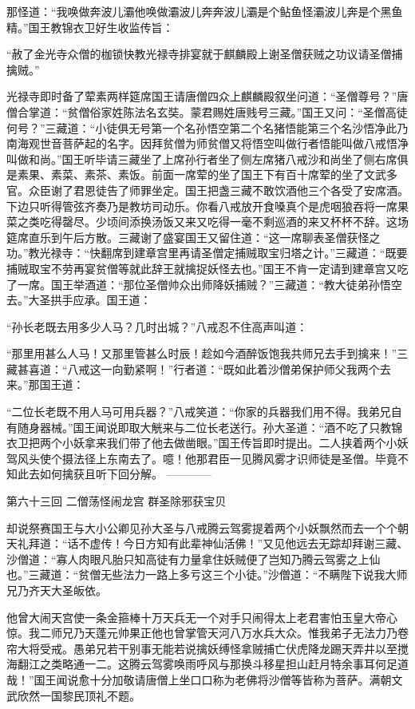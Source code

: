 \documentclass[12pt,UTF8]{ctexbook}
\begin{document}
那怪道：“我唤做奔波儿灞他唤做灞波儿奔奔波儿灞是个鲇鱼怪灞波儿奔是个黑鱼精。”国王教锦衣卫好生收监传旨：

“赦了金光寺众僧的枷锁快教光禄寺排宴就于麒麟殿上谢圣僧获贼之功议请圣僧捕擒贼。”

光禄寺即时备了荤素两样筵席国王请唐僧四众上麒麟殿叙坐问道：“圣僧尊号？”唐僧合掌道：“贫僧俗家姓陈法名玄奘。蒙君赐姓唐贱号三藏。”国王又问：“圣僧高徒何号？”三藏道：“小徒俱无号第一个名孙悟空第二个名猪悟能第三个名沙悟净此乃南海观世音菩萨起的名字。因拜贫僧为师贫僧又将悟空叫做行者悟能叫做八戒悟净叫做和尚。”国王听毕请三藏坐了上席孙行者坐了侧左席猪八戒沙和尚坐了侧右席俱是素果、素菜、素茶、素饭。前面一席荤的坐了国王下有百十席荤的坐了文武多官。众臣谢了君恩徒告了师罪坐定。国王把盏三藏不敢饮酒他三个各受了安席酒。下边只听得管弦齐奏乃是教坊司动乐。你看八戒放开食嗓真个是虎咽狼吞将一席果菜之类吃得罄尽。少顷间添换汤饭又来又吃得一毫不剩巡酒的来又杯杯不辞。这场筵席直乐到午后方散。三藏谢了盛宴国王又留住道：“这一席聊表圣僧获怪之功。”教光禄寺：“快翻席到建章宫里再请圣僧定捕贼取宝归塔之计。”三藏道：“既要捕贼取宝不劳再宴贫僧等就此辞王就擒捉妖怪去也。”国王不肯一定请到建章宫又吃了一席。国王举酒道：“那位圣僧帅众出师降妖捕贼？”三藏道：“教大徒弟孙悟空去。”大圣拱手应承。国王道：

“孙长老既去用多少人马？几时出城？”八戒忍不住高声叫道：

“那里用甚么人马！又那里管甚么时辰！趁如今酒醉饭饱我共师兄去手到擒来！”三藏甚喜道：“八戒这一向勤紧啊！”行者道：“既如此着沙僧弟保护师父我两个去来。”那国王道：

“二位长老既不用人马可用兵器？”八戒笑道：“你家的兵器我们用不得。我弟兄自有随身器械。”国王闻说即取大觥来与二位长老送行。孙大圣道：“酒不吃了只教锦衣卫把两个小妖拿来我们带了他去做凿眼。”国王传旨即时提出。二人挟着两个小妖驾风头使个摄法径上东南去了。噫！他那君臣一见腾风雾才识师徒是圣僧。毕竟不知此去如何擒获且听下回分解。
------------

第六十三回 二僧荡怪闹龙宫 群圣除邪获宝贝

却说祭赛国王与大小公卿见孙大圣与八戒腾云驾雾提着两个小妖飘然而去一个个朝天礼拜道：“话不虚传！今日方知有此辈神仙活佛！”又见他远去无踪却拜谢三藏、沙僧道：“寡人肉眼凡胎只知高徒有力量拿住妖贼便了岂知乃腾云驾雾之上仙也。”三藏道：“贫僧无些法力一路上多亏这三个小徒。”沙僧道：“不瞒陛下说我大师兄乃齐天大圣皈依。

他曾大闹天宫使一条金箍棒十万天兵无一个对手只闹得太上老君害怕玉皇大帝心惊。我二师兄乃天蓬元帅果正他也曾掌管天河八万水兵大众。惟我弟子无法力乃卷帘大将受戒。愚弟兄若干别事无能若说擒妖缚怪拿贼捕亡伏虎降龙踢天弄井以至搅海翻江之类略通一二。这腾云驾雾唤雨呼风与那换斗移星担山赶月特余事耳何足道哉！”国王闻说愈十分加敬请唐僧上坐口口称为老佛将沙僧等皆称为菩萨。满朝文武欣然一国黎民顶礼不题。
\end{document}
